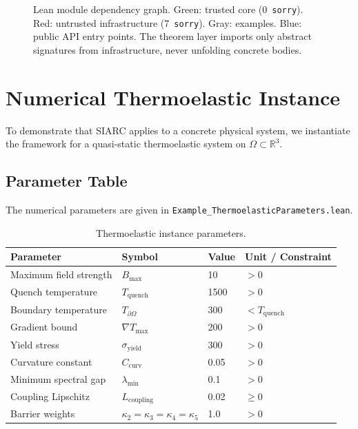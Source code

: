 \documentclass[11pt,a4paper]{article}
\theoremstyle{plain}
\theoremstyle{definition}
\theoremstyle{remark}
\newcommand{\R}{\mathbb{R}}
\newcommand{\kk}{\kappa}
\newcommand{\sorry}{\texttt{sorry}}
\newcommand{\leaninline}[1]{\texttt{#1}}
\begin{document}
\begin{figure}[ht]
\caption{Lean module dependency graph.  Green: trusted core (0~\sorry{}).
Red: untrusted infrastructure (7~\sorry{}).  Gray: examples.
Blue: public API entry points.  The theorem layer imports only
abstract signatures from infrastructure, never unfolding concrete bodies.}
\label{fig:modules}
\end{figure}


\section{Numerical Thermoelastic Instance}\label{sec:thermo}

To demonstrate that SIARC applies to a concrete physical system, we
instantiate the framework for a quasi-static thermoelastic system on
$\Omega \subset \R^3$.

\subsection{Parameter Table}

The numerical parameters are given in
\leaninline{Example\_ThermoelasticParameters.lean}.

\begin{table}[ht]
\centering
\caption{Thermoelastic instance parameters.}
\label{tab:params}
\begin{tabular}{llll}
\toprule
Parameter & Symbol & Value & Unit / Constraint \\
\midrule
Maximum field strength & $B_{\max}$ & 10 & $> 0$ \\
Quench temperature & $T_{\mathrm{quench}}$ & 1500 & $> 0$ \\
Boundary temperature & $T_{\partial\Omega}$ & 300 & $< T_{\mathrm{quench}}$ \\
Gradient bound & $\nabla T_{\max}$ & 200 & $> 0$ \\
Yield stress & $\sigma_{\mathrm{yield}}$ & 300 & $> 0$ \\
Curvature constant & $C_{\mathrm{curv}}$ & 0.05 & $> 0$ \\
Minimum spectral gap & $\lambda_{\min}$ & 0.1 & $> 0$ \\
Coupling Lipschitz & $L_{\mathrm{coupling}}$ & 0.02 & $\ge 0$ \\
Barrier weights & $\kk_2 = \kk_3 = \kk_4 = \kk_5$ & 1.0 & $> 0$ \\
\bottomrule
\end{tabular}
\end{table}
\end{document}
